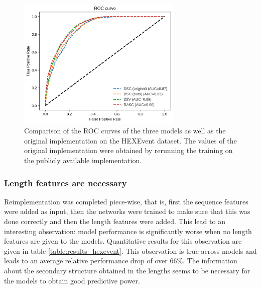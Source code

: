 \begin{figure}
	\centering\includegraphics[width=0.7\textwidth]{../visualizations/ch5-results/hexevent_cross_model_roc_auc_comparison.png} 
	\caption{Comparison of the ROC curves of the three models as well as the original implementation on the HEXEvent dataset. The values of the original implementation were obtained by rerunning the training on the publicly available implementation. }
	\label{fig:hexevent_auc}
\end{figure}






\subsubsection{Length features are necessary}
Reimplementation was completed piece-wise, that is, first the sequence features were added as input, then the networks were trained to make sure that this was done correctly and then the length features were added. This lead to an interesting observation: model performance is significantly worse when no length features are given to the models. Quantitative results for this observation are given in table \ref{table:results_hexevent}. This observation is true across models and leads to an average relative performance drop of over 66\%. The information about the secondary structure obtained in the lengths seems to be necessary for the models to obtain good predictive power.

